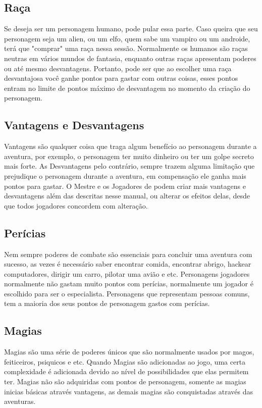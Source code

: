 \subsection{Raça}

Se deseja ser um personagem humano, pode pular essa parte. Caso queira que seu personagem seja um alien, ou um elfo, quem sabe um vampiro ou um androide, terá que "comprar" uma raça nessa sessão. Normalmente os humanos são raças neutras em vários mundos de fantasia, enquanto outras raças apresentam poderes ou até mesmo desvantagens. Portanto, pode ser que ao escolher uma raça desvantajosa você ganhe pontos para gastar com outras coisas, esses pontos entram no limite de pontos máximo de desvantagem no momento da criação do personagem.

\subsection{Vantagens e Desvantagens}

Vantagens são qualquer coisa que traga algum benefício ao personagem durante a aventura, por exemplo, o personagem ter muito dinheiro ou ter um golpe secreto mais forte. As Desvantagens pelo contrário, sempre trazem alguma limitação que prejudique o personagem durante a aventura, em compensação ele ganha mais pontos para gastar. O Mestre e os Jogadores de podem criar mais vantagens e desvantagens além das descritas nesse manual, ou alterar os efeitos delas, desde que todos jogadores concordem com alteração.

\subsection{Perícias}

Nem sempre poderes de combate são essenciais para concluir uma aventura com sucesso, as vezes é necessário saber encontrar comida, encontrar abrigo, hackear computadores, dirigir um carro, pilotar uma avião e etc. Personagens jogadores normalmente não gastam muito pontos com perícias, normalmente um jogador é escolhido para ser o especialista. Personagens que representam pessoas comuns, tem a maioria dos seus pontos de personagem gastos com perícias.

\subsection{Magias}

Magias são uma série de poderes únicos que são normalmente usados por magos, feiticeiros, psiquicos e etc. Quando Magias são adicionadas ao jogo, uma certa complexidade é adicionada devido ao nível de possibilidades que elas permitem ter. Magias não são adquiridas com pontos de personagem, somente as magias inicias básicas através vantagens, as demais magias são conquistadas através das aventuras.

